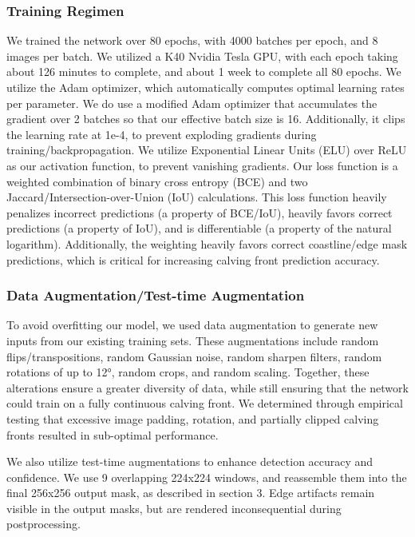 \documentclass[tc, manuscript]{copernicus}
\begin{document}
\subsubsection{Training Regimen}
We trained the network over 80 epochs, with 4000 batches per epoch, and 8 images per batch. We utilized a K40 Nvidia Tesla GPU, with each epoch taking about 126 minutes to complete, and about 1 week to complete all 80 epochs. We utilize the Adam optimizer, which automatically computes optimal learning rates per parameter. We do use a modified Adam optimizer that accumulates the gradient over 2 batches so that our effective batch size is 16. Additionally, it clips the learning rate at 1e-4, to prevent exploding gradients during training/backpropagation.
We utilize Exponential Linear Units (ELU) over ReLU as our activation function, to prevent vanishing gradients. Our loss function is a weighted combination of binary cross entropy (BCE) and two Jaccard/Intersection-over-Union (IoU) calculations. 
This loss function heavily penalizes incorrect predictions (a property of BCE/IoU), heavily favors correct predictions (a property of IoU), and is differentiable (a property of the natural logarithm). Additionally, the weighting heavily favors correct coastline/edge mask predictions, which is critical for increasing calving front prediction accuracy.

\subsubsection{Data Augmentation/Test-time Augmentation}
To avoid overfitting our model, we used data augmentation to generate new inputs from our existing training sets. These augmentations include random flips/transpositions, random Gaussian noise, random sharpen filters, random rotations of up to 12°, random crops, and random scaling. Together, these alterations ensure a greater diversity of data, while still ensuring that the network could train on a fully continuous calving front. We determined through empirical testing that excessive image padding, rotation, and partially clipped calving fronts resulted in sub-optimal performance.

We also utilize test-time augmentations to enhance detection accuracy and confidence. We use 9 overlapping 224x224 windows, and reassemble them into the final 256x256 output mask, as described in section 3. Edge artifacts remain visible in the output masks, but are rendered inconsequential during postprocessing.
\end{document}
